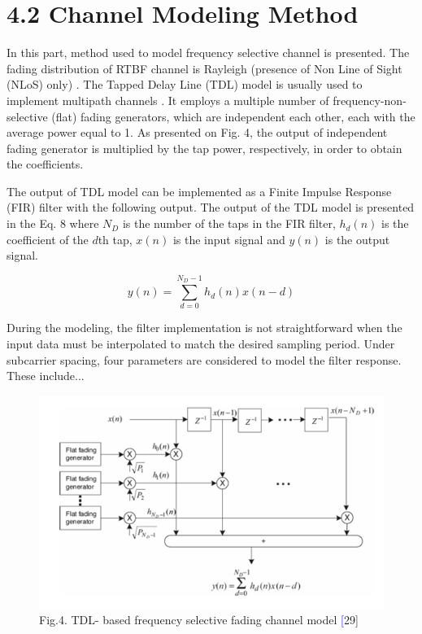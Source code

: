 \documentclass[10pt]{article}
\begin{document}
\section*{4.2 Channel Modeling Method}
In this part, method used to model frequency selective channel is presented. The fading distribution of RTBF channel is Rayleigh (presence of Non Line of Sight (NLoS) only) \cite{29}. The Tapped Delay Line (TDL) model is usually used to implement multipath channels \cite{30}. It employs a multiple number of frequency-non-selective (flat) fading generators, which are independent each other, each with the average power equal to 1. As presented on Fig. 4, the output of independent fading generator is multiplied by the tap power, respectively, in order to obtain the coefficients. 

The output of TDL model can be implemented as a Finite Impulse Response (FIR) filter with the following output. The output of the TDL model is presented in the Eq. 8 where $N_D$ is the number of the taps in the FIR filter, $h_d(n)$ is the coefficient of the $d$th tap, $x(n)$ is the input signal and $y(n)$ is the output signal.

\begin{equation}
    y(n) = \sum_{d=0}^{N_D-1} h_d(n)x(n-d)
\end{equation}

During the modeling, the filter implementation is not straightforward when the input data must be interpolated to match the desired sampling period. Under subcarrier spacing, four parameters are considered to model the filter response. These include...


    \begin{figure}
        \centering
        \includegraphics[width=1\textwidth]{schema1.png} 
        \caption{{ Fig.4. TDL}- based frequency selective fading channel model \textcolor{blue}[29]}
        \label{fig:example}
    \end{figure}
\end{document}

